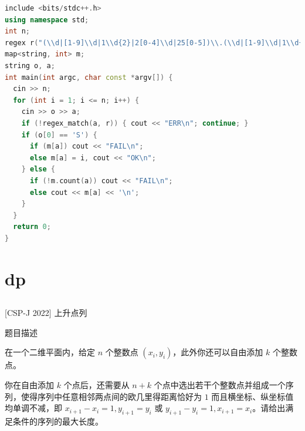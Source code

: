 \documentclass[12pt,twiside,a4paper]{ctexbook}
\numberwithin{chapter}{part}
\begin{document}
\begin{lstlisting}[language=c++,breaklines=true]
include <bits/stdc++.h>
using namespace std;
int n;
regex r("(\\d|[1-9]\\d|1\\d{2}|2[0-4]\\d|25[0-5])\\.(\\d|[1-9]\\d|1\\d{2}|2[0-4]\\d|25[0-5])\\.(\\d|[1-9]\\d|1\\d{2}|2[0-4]\\d|25[0-5])\\.(\\d|[1-9]\\d|1\\d{2}|2[0-4]\\d|25[0-5]):(\\d|[1-9]\\d{1,3}|[1-5]\\d{4}|6[0-4]\\d{3}|65[0-4]\\d{2}|655[0-2]\\d|6553[0-5])");
map<string, int> m;
string o, a;
int main(int argc, char const *argv[]) {
  cin >> n;
  for (int i = 1; i <= n; i++) {
    cin >> o >> a;
    if (!regex_match(a, r)) { cout << "ERR\n"; continue; }
    if (o[0] == 'S') {
      if (m[a]) cout << "FAIL\n";
      else m[a] = i, cout << "OK\n";
    } else {
      if (!m.count(a)) cout << "FAIL\n";
      else cout << m[a] << '\n';
    }
  }
  return 0;
}
\end{lstlisting}

\chapter{dp}
\section{}
 [CSP-J 2022] 上升点列

 题目描述

在一个二维平面内，给定 $n$ 个整数点 $(x_i, y_i)$，此外你还可以自由添加 $k$ 个整数点。

你在自由添加 $k$ 个点后，还需要从 $n + k$ 个点中选出若干个整数点并组成一个序列，使得序列中任意相邻两点间的欧几里得距离恰好为 $1$ 而且横坐标、纵坐标值均单调不减，即 $x_{i+1} - x_i = 1, y_{i+1} = y_i$ 或 $y_{i+1} - y_i = 1, x_{i+1} = x_i$。请给出满足条件的序列的最大长度。
\end{document}
